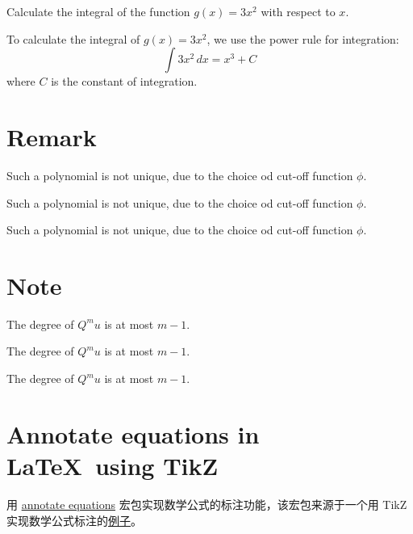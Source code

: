 \documentclass[fontset=none]{ctexart}
\begin{document}
\begin{problem*}
    Calculate the integral of the function $g(x) = 3x^2$ with respect to $x$.
\end{problem*}
\begin{solution*}
    To calculate the integral of $g(x) = 3x^2$, we use the power rule for integration:
    \[
        \int 3x^2 \, dx = x^3 + C
    \]
    where $C$ is the constant of integration.
\end{solution*}

\section{Remark}

\begin{remark}
    Such a polynomial is not unique, due to the choice od cut-off function $\phi$.
\end{remark}

\begin{remark}[xxx]
    Such a polynomial is not unique, due to the choice od cut-off function $\phi$.
\end{remark}

\begin{remark*}
    Such a polynomial is not unique, due to the choice od cut-off function $\phi$.
\end{remark*}

\section{Note}

\begin{note}
    The degree of $Q^m u$ is at most $m-1$.
\end{note}

\begin{note}[xxx]
    The degree of $Q^m u$ is at most $m-1$.
\end{note}

\begin{note*}
    The degree of $Q^m u$ is at most $m-1$.
\end{note*}

\section{Annotate equations in \LaTeX\ using TikZ}

用 \href{https://github.com/st--/annotate-equations}{annotate equations} 宏包实现数学公式的标注功能，该宏包来源于一个用 TikZ 实现数学公式标注的\href{https://github.com/synercys/annotated_latex_equations}{例子}。
\end{document}
